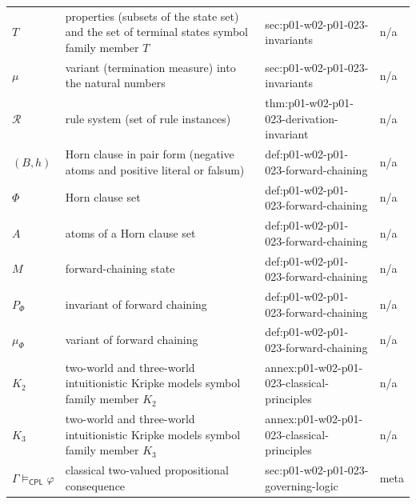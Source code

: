 \begin{longtable}{@{}p{}p{}p{}p{}@{}}
\(T\) & properties (subsets of the state set) and the set of terminal states symbol family member \(T\) & sec:\allowbreak{}p01-\allowbreak{}w02-\allowbreak{}p01-\allowbreak{}023-\allowbreak{}invariants & n/a \\
\(\mu\) & variant (termination measure) into the natural numbers & sec:\allowbreak{}p01-\allowbreak{}w02-\allowbreak{}p01-\allowbreak{}023-\allowbreak{}invariants & n/a \\
\(\mathcal R\) & rule system (set of rule instances) & thm:\allowbreak{}p01-\allowbreak{}w02-\allowbreak{}p01-\allowbreak{}023-\allowbreak{}derivation-\allowbreak{}invariant & n/a \\
\((B,\allowbreak h)\) & Horn clause in pair form (negative atoms and positive literal or falsum) & def:\allowbreak{}p01-\allowbreak{}w02-\allowbreak{}p01-\allowbreak{}023-\allowbreak{}forward-\allowbreak{}chaining & n/a \\
\(\Phi\) & Horn clause set & def:\allowbreak{}p01-\allowbreak{}w02-\allowbreak{}p01-\allowbreak{}023-\allowbreak{}forward-\allowbreak{}chaining & n/a \\
\(A\) & atoms of a Horn clause set & def:\allowbreak{}p01-\allowbreak{}w02-\allowbreak{}p01-\allowbreak{}023-\allowbreak{}forward-\allowbreak{}chaining & n/a \\
\(M\) & forward-chaining state & def:\allowbreak{}p01-\allowbreak{}w02-\allowbreak{}p01-\allowbreak{}023-\allowbreak{}forward-\allowbreak{}chaining & n/a \\
\(P_\Phi\) & invariant of forward chaining & def:\allowbreak{}p01-\allowbreak{}w02-\allowbreak{}p01-\allowbreak{}023-\allowbreak{}forward-\allowbreak{}chaining & n/a \\
\(\mu_\Phi\) & variant of forward chaining & def:\allowbreak{}p01-\allowbreak{}w02-\allowbreak{}p01-\allowbreak{}023-\allowbreak{}forward-\allowbreak{}chaining & n/a \\
\(K_2\) & two-world and three-world intuitionistic Kripke models symbol family member \(K_2\) & annex:\allowbreak{}p01-\allowbreak{}w02-\allowbreak{}p01-\allowbreak{}023-\allowbreak{}classical-\allowbreak{}principles & n/a \\
\(K_3\) & two-world and three-world intuitionistic Kripke models symbol family member \(K_3\) & annex:\allowbreak{}p01-\allowbreak{}w02-\allowbreak{}p01-\allowbreak{}023-\allowbreak{}classical-\allowbreak{}principles & n/a \\
\(\Gamma\models_{\mathsf{CPL}}\varphi\) & classical two-valued propositional consequence & sec:\allowbreak{}p01-\allowbreak{}w02-\allowbreak{}p01-\allowbreak{}023-\allowbreak{}governing-\allowbreak{}logic & meta \\

\end{longtable}
